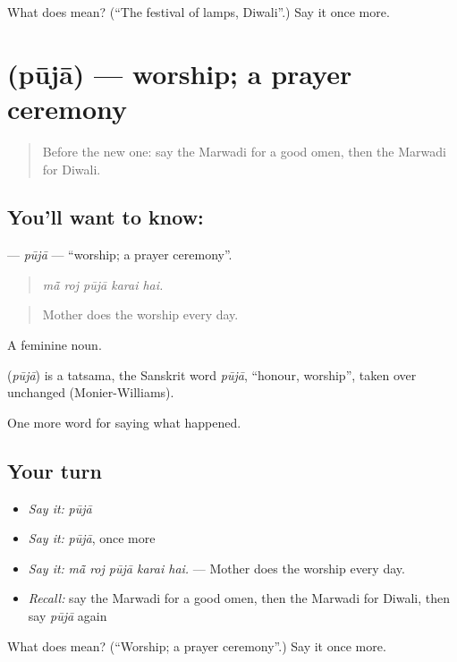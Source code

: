 \begin{tcolorbox}[breakable,colback=teal!4,colframe=teal!35!black,title={Before you move on}]
What does  mean? (\textquotedblleft{}The festival of lamps, Diwali\textquotedblright{}.) Say it once more.
\end{tcolorbox}
\section[\texorpdfstring{\mw{पूजा} (pūjā)}{पूजा (pūjā)}]{ (pūjā) — worship; a prayer ceremony}

\label{lesson:MW-C249-puja}



\begin{quote}
Before the new one: say the Marwadi for a good omen, then the Marwadi for Diwali.
\end{quote}

\subsection*{You'll want to know: }
\textbf{} — \emph{pūjā} — \textquotedblleft{}worship; a prayer ceremony\textquotedblright{}.

\begin{quote}
    
\end{quote}

\begin{quote}
\emph{mā̃ roj pūjā karai hai.}
\end{quote}

\begin{quote}
Mother does the worship every day.
\end{quote}

A feminine noun.

\begin{cousinweb}
\textbf{} (\emph{pūjā}) is a tatsama, the Sanskrit word \emph{pūjā}, \textquotedblleft{}honour, worship\textquotedblright{}, taken over unchanged (Monier-Williams).
\end{cousinweb}

\begin{grammarlens}[title={What you've built}]
One more word for saying what happened.
\end{grammarlens}

\subsection*{Your turn}
\begin{itemize}
\raggedright
  \item \emph{Say it:} \emph{pūjā}
  \item \emph{Say it:} \emph{pūjā}, once more
  \item \emph{Say it:} \emph{mā̃ roj pūjā karai hai.} — Mother does the worship every day.
  \item \emph{Recall:} say the Marwadi for a good omen, then the Marwadi for Diwali, then say \emph{pūjā} again
\end{itemize}

\begin{tcolorbox}[breakable,colback=teal!4,colframe=teal!35!black,title={Before you move on}]
What does  mean? (\textquotedblleft{}Worship; a prayer ceremony\textquotedblright{}.) Say it once more.
\end{tcolorbox}
